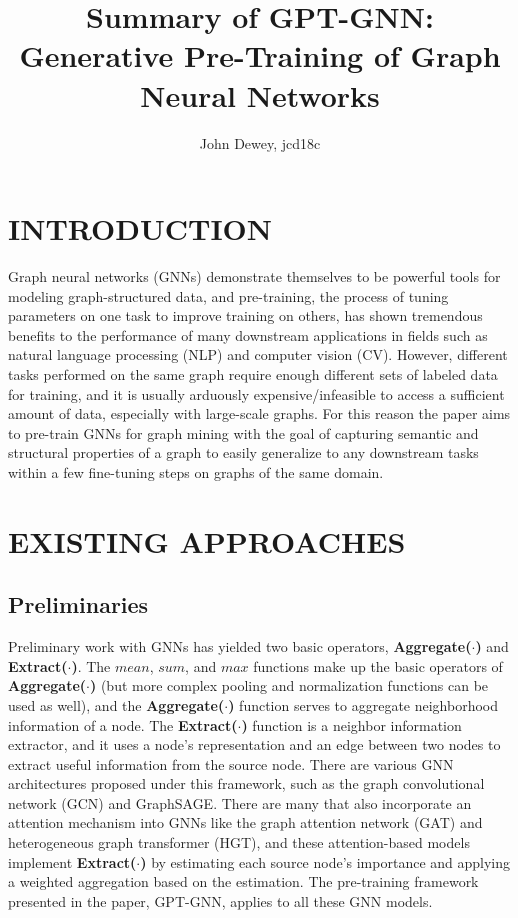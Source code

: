 \documentclass[sigconf,natbib=false]{acmart}
\newcommand{\agg}{\textbf{Aggregate($\cdot$)}}
\newcommand{\ext}{\textbf{Extract($\cdot$)}}
\begin{document}
	\title{Summary of GPT-GNN: Generative Pre-Training of Graph Neural Networks}
	\author{John Dewey, jcd18c}

	\maketitle

	\section{INTRODUCTION}
	
Graph neural networks (GNNs) demonstrate themselves to be powerful tools for modeling graph-structured data, and pre-training, the process of tuning parameters on one task to improve training on others, has shown tremendous benefits to the performance of many downstream applications in fields such as natural language processing (NLP) and computer vision (CV). However, different tasks performed on the same graph require enough different sets of labeled data for training, and it is usually arduously expensive/infeasible to access a sufficient amount of data, especially with large-scale graphs. For this reason the paper aims to pre-train GNNs for graph mining with the goal of capturing semantic and structural properties of a graph to easily generalize to any downstream tasks within a few fine-tuning steps on graphs of the same domain.

	\section{EXISTING APPROACHES}
	\subsection{Preliminaries}
Preliminary work with GNNs has yielded two basic operators, \agg{} and \ext{}. The $mean$, $sum$, and $max$ functions make up the basic operators of \agg{} (but more complex pooling and normalization functions can be used as well), and the \agg{} function serves to aggregate neighborhood information of a node. The \ext{} function is a neighbor information extractor, and it uses a node's representation and an edge between two nodes to extract useful information from the source node. There are various GNN architectures proposed under this framework, such as the graph convolutional network (GCN) and GraphSAGE. There are many that also incorporate an attention mechanism into GNNs like the graph attention network (GAT) and heterogeneous graph transformer (HGT), and these attention-based models implement \ext{} by estimating each source node's importance and applying a weighted aggregation based on the estimation. The pre-training framework presented in the paper, GPT-GNN, applies to all these GNN models.
\end{document}
